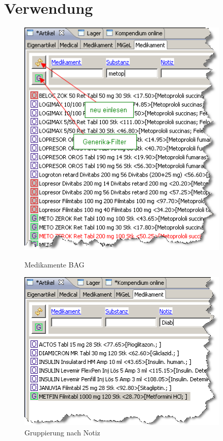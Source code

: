 \documentclass[a4paper]{scrartcl}
\begin{document}
\section{Verwendung}
\begin{figure}[htbp]
     \begin{minipage}{0.5\textwidth}
      \centering
       \includegraphics[width=0.9\textwidth]{liste1}
       \caption{Medikamente BAG}
       	\label{fig:bagmedi}
     \end{minipage}\hfill
     \begin{minipage}{0.5\textwidth}
      \centering
       \includegraphics[width=0.9\textwidth]{liste2}
       \caption{Gruppierung nach Notiz}
       \label{fig:bagmedi2}
     \end{minipage}
\end{figure}
\end{document}
